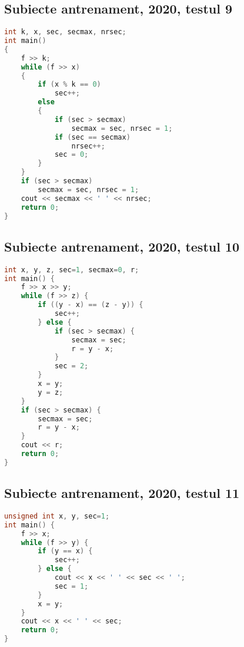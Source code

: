 \documentclass[10pt, a4paper, twocolumn]{article}
\begin{document}
\subsection*{Subiecte antrenament, 2020, testul 9}
\begin{lstlisting}[language=C++]
int k, x, sec, secmax, nrsec;
int main()
{
    f >> k;
    while (f >> x)
    {
        if (x % k == 0)
            sec++;
        else
        {
            if (sec > secmax)
                secmax = sec, nrsec = 1;
            if (sec == secmax)
                nrsec++;
            sec = 0;
        }
    }
    if (sec > secmax)
        secmax = sec, nrsec = 1;
    cout << secmax << ' ' << nrsec;
    return 0;
}
\end{lstlisting}



\subsection*{Subiecte antrenament, 2020, testul 10}
\begin{lstlisting}[language=C++]
int x, y, z, sec=1, secmax=0, r;
int main() {
    f >> x >> y;
    while (f >> z) {
        if ((y - x) == (z - y)) {
            sec++;
        } else {
            if (sec > secmax) {
                secmax = sec;
                r = y - x;
            }
            sec = 2;
        }
        x = y;
        y = z;
    }
    if (sec > secmax) {
        secmax = sec;
        r = y - x;
    }
    cout << r;
    return 0;
}
\end{lstlisting}


\subsection*{Subiecte antrenament, 2020, testul 11}
\begin{lstlisting}[language=C++]
unsigned int x, y, sec=1;
int main() {
    f >> x;
    while (f >> y) {
        if (y == x) {
            sec++;
        } else {
            cout << x << ' ' << sec << ' ';
            sec = 1;
        }
        x = y;
    }
    cout << x << ' ' << sec;
    return 0;
}
\end{lstlisting}
\end{document}
